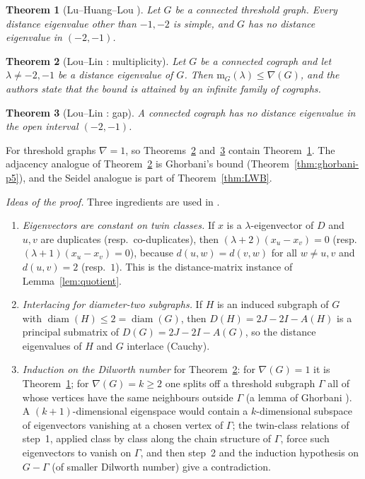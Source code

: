 \documentclass[11pt]{article}
\theoremstyle{plain}
\newtheorem{theorem}{Theorem}[section]
\theoremstyle{definition}
\theoremstyle{remark}
\begin{document}
	\begin{theorem}[Lu--Huang--Lou \cite{LuHuangLou2018}]
		\label{thm:LHL}
		Let $G$ be a connected threshold graph. Every distance eigenvalue other than $-1,-2$ is simple, and $G$ has no distance eigenvalue in $(-2,-1)$.
	\end{theorem}
	
	\begin{theorem}[Lou--Lin \cite{LouLin2020}: multiplicity]
		\label{thm:LL-mult}
		Let $G$ be a connected cograph and let $\lambda\ne-2,-1$ be a distance eigenvalue of $G$. Then $\mathrm{m}_G(\lambda)\le\nabla(G)$, and the authors state that the bound is attained by an infinite family of cographs.
	\end{theorem}
	
	\begin{theorem}[Lou--Lin \cite{LouLin2020}: gap]
		\label{thm:LL-gap}
		A connected cograph has no distance eigenvalue in the open interval $(-2,-1)$.
	\end{theorem}
	
	For threshold graphs $\nabla=1$, so Theorems~\ref{thm:LL-mult} and~\ref{thm:LL-gap} contain Theorem~\ref{thm:LHL}. The adjacency analogue of Theorem~\ref{thm:LL-mult} is Ghorbani's bound \cite{Ghorbani2019p5} (Theorem~\ref{thm:ghorbani-p5}), and the Seidel analogue is part of Theorem~\ref{thm:LWB}.
	
	\medskip\noindent\emph{Ideas of the proof.} Three ingredients are used in \cite{LouLin2020}.
	\begin{enumerate}
		\item \emph{Eigenvectors are constant on twin classes.} If $x$ is a $\lambda$-eigenvector of $D$ and $u,v$ are duplicates (resp.\ co-duplicates), then $(\lambda+2)(x_u-x_v)=0$ (resp.\ $(\lambda+1)(x_u-x_v)=0$), because $d(u,w)=d(v,w)$ for all $w\ne u,v$ and $d(u,v)=2$ (resp.\ $1$). This is the distance-matrix instance of Lemma~\ref{lem:quotient}.
		\item \emph{Interlacing for diameter-two subgraphs.} If $H$ is an induced subgraph of $G$ with $\operatorname{diam}(H)\le2=\operatorname{diam}(G)$, then $D(H)=2J-2I-A(H)$ is a principal submatrix of $D(G)=2J-2I-A(G)$, so the distance eigenvalues of $H$ and $G$ interlace (Cauchy).
		\item \emph{Induction on the Dilworth number} for Theorem~\ref{thm:LL-mult}: for $\nabla(G)=1$ it is Theorem~\ref{thm:LHL}; for $\nabla(G)=k\ge2$ one splits off a threshold subgraph $\Gamma$ all of whose vertices have the same neighbours outside $\Gamma$ (a lemma of Ghorbani \cite{Ghorbani2019p5}). A $(k{+}1)$-dimensional eigenspace would contain a $k$-dimensional subspace of eigenvectors vanishing at a chosen vertex of $\Gamma$; the twin-class relations of step~1, applied class by class along the chain structure of $\Gamma$, force such eigenvectors to vanish on $\Gamma$, and then step~2 and the induction hypothesis on $G-\Gamma$ (of smaller Dilworth number) give a contradiction.
	\end{enumerate}
	
\end{document}
